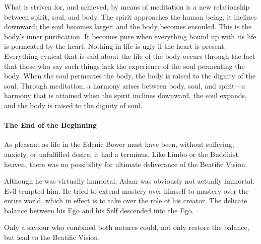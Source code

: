 \begin{quotex}
What is striven for, and achieved, by means of meditation is a new relationship between spirit, soul, and body. The spirit approaches the human being, it inclines downward; the soul becomes larger; and the body becomes ensouled. This is the body's inner purification. It becomes pure when everything bound up with its life is permeated by the heart. Nothing in life is ugly if the heart is present. Everything cynical that is said about the life of the body occurs through the fact that those who say such things lack the experience of the soul permeating the body. When the soul permeates the body, the body is raised to the dignity of the soul. Through meditation, a harmony arises between body, soul, and spirit—a harmony that is attained when the spirit inclines downward, the soul expands, and the body is raised to the dignity of soul. 

\end{quotex}
\paragraph{The End of the Beginning}
As pleasant as life in the Edenic Bower must have been, without suffering, anxiety, or unfulfilled desire, it had a terminus. Like Limbo or the Buddhist heaven, there was no possibility for ultimate deliverance of the Beatific Vision.

Although he was virtually immortal, Adam was obviously not actually immortal. Evil tempted him. He tried to extend mastery over himself to mastery over the entire world, which in effect is to take over the role of his creator. The delicate balance between his Ego and his Self descended into the Ego.

Only a saviour who combined both natures could, not only restore the balance, but lead to the Beatific Vision.



